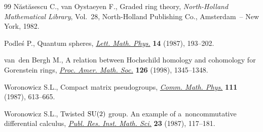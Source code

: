 \documentclass[10pt,a4paper]{amsart}
\numberwithin{equation}{section}
\begin{document}
\begin{thebibliography}{99}
N{\u{a}}st{\u{a}}sescu C., van Oystaeyen F., Graded ring theory,
 \textit{North-Holland Mathematical Library}, Vol.~28, North-Holland
 Publishing Co., Amsterdam~-- New York, 1982.

Podle{\'s} P., Quantum spheres, \href{http://dx.doi.org/10.1007/BF00416848}{\textit{Lett. Math. Phys.}} \textbf{14} (1987),
 193--202.

van~den Bergh M., A relation between {H}ochschild homology and cohomology for
 {G}orenstein rings, \href{http://dx.doi.org/10.1090/S0002-9939-98-04210-5}{\textit{Proc. Amer. Math. Soc.}} \textbf{126} (1998),
 1345--1348.

Woronowicz S.L., Compact matrix pseudogroups, \href{http://dx.doi.org/10.1007/BF01219077}{\textit{Comm. Math. Phys.}}
 \textbf{111} (1987), 613--665.

Woronowicz S.L., Twisted {${\rm SU}(2)$} group. {A}n example of
 a~noncommutative dif\/ferential calculus, \href{http://dx.doi.org/10.2977/prims/1195176848}{\textit{Publ. Res. Inst. Math. Sci.}}
 \textbf{23} (1987), 117--181.

\end{thebibliography}
\end{document}
